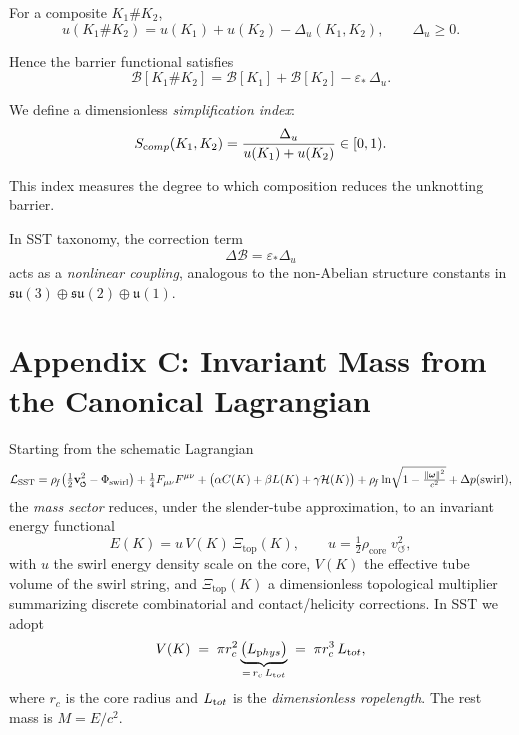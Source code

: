 \documentclass[11pt]{article}
\newcommand{\swirlarrow}{%
     \mathchoice{\mkern-2mu\scriptstyle\boldsymbol{\circlearrowleft}}%
                {\mkern-2mu\scriptstyle\boldsymbol{\circlearrowleft}}%
                {\mkern-2mu\scriptscriptstyle\boldsymbol{\circlearrowleft}}%
                {\mkern-2mu\scriptscriptstyle\boldsymbol{\circlearrowleft}}%
}
\newcommand{\vswirl}{\mathbf{v}_{\swirlarrow}}
\newcommand{\rhof}{\rho_{\!f}}                           %
\begin{document}
For a composite $K_1 \# K_2$,
\[
    u(K_1 \# K_2)
    = u(K_1) + u(K_2) - \Delta_u(K_1,K_2),
    \qquad \Delta_u \ge 0.
\]

Hence the barrier functional satisfies
\[
    \mathcal B[K_1 \# K_2]
    = \mathcal B[K_1] + \mathcal B[K_2] - \varepsilon_*\,\Delta_u.
\]

We define a dimensionless \emph{simplification index}:
\[
    S_{\textrm comp}(K_1,K_2)
    = \frac{\Delta_u}{u(K_1)+u(K_2)} \in [0,1).
\]

This index measures the degree to which composition
reduces the unknotting barrier.

\medskip

In SST taxonomy, the correction term
\[
    \Delta\mathcal B = \varepsilon_* \Delta_u
\]
acts as a \emph{nonlinear coupling},
analogous to the non-Abelian structure constants
in $\mathfrak{su}(3)\oplus\mathfrak{su}(2)\oplus\mathfrak{u}(1)$.



\section*{Appendix C: Invariant Mass from the Canonical Lagrangian}

Starting from the schematic Lagrangian
\[
    \mathcal{L}_{\text{SST}}
    = \rhof\!\left(\tfrac{1}{2}\vswirl^2 - \Phi_{\text{swirl}}\right)
    + \tfrac{1}{4}F_{\mu\nu}F^{\mu\nu}
    + \big(\alpha C(K)+\beta L(K)+\gamma \mathcal{H}(K)\big)
    + \rhof \ln\!\sqrt{1-\tfrac{\|\boldsymbol\omega\|^2}{c^2}}
    + \Delta p(\text{swirl}),
\]
the \emph{mass sector} reduces, under the slender-tube approximation, to an invariant energy functional
\[
    E(K)= u\,V(K)\,\Xi_{\text{top}}(K),\qquad
    u=\tfrac{1}{2}\rho_{\text{core}}\;v_{\circlearrowleft}^{2},
\]
with $u$ the swirl energy density scale on the core, $V(K)$ the effective tube volume of the swirl string, and $\Xi_{\text{top}}(K)$ a dimensionless topological multiplier summarizing discrete combinatorial and contact/helicity corrections. In SST we adopt
\[
    V(K)\;=\;\pi r_c^2 \underbrace{\big(L_{\textrm phys}\big)}_{=\,r_c\,L_{\textrm tot}}
    \;=\;\pi r_c^3\,L_{\textrm tot},
\]
where $r_c$ is the core radius and $L_{\textrm tot}$ is the \emph{dimensionless ropelength}. The rest mass is $M=E/c^2$.
\end{document}
